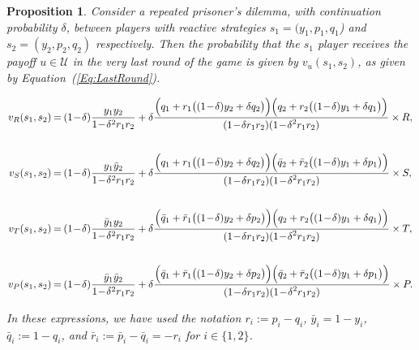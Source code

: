 \documentclass[11pt]{article}
\theoremstyle{plainCl1}
\newtheorem{Prop}{Proposition}
\theoremstyle{plainCl2}
\begin{document}
\begin{Prop}
    Consider a repeated prisoner's dilemma, with
    continuation probability $\delta$, between players with reactive strategies
    $s_1\!=\!(y_1, p_1, q_1$)  and $s_2\!=\!(y_2,p_2,q_2)$ respectively. Then the
    probability that the $s_1$ player receives the payoff $u\!\in\! \mathcal{U}$ in
    the very last round of the game is given by $v_{u}(s_1,s_2)$, as given by
    Equation~(\ref{Eq:LastRound}).

    \begin{equation} \label{Eq:LastRound}
      \setlength{\arraycolsep}{1pt}
      \begin{array}{rcl}
    
      v_{R}(s_1,s_2) &= &\displaystyle (1\!-\!\delta)\frac{y_1y_2}{1\!-\!\delta^2 r_1 r_2}+\delta \frac{\Big(q_1+r_1\big((1\!-\!\delta)y_2+\delta q_2\big)\Big) \Big(q_2+r_2\big((1\!-\!\delta)y_1+\delta q_1\big)\Big)}
      {\displaystyle(1\!-\!\delta r_1r_2)(1\!-\!\delta^2 r_1 r_2)} \times R,\\[1cm]
    
      v_{S}(s_1,s_2) &= &\displaystyle (1\!-\!\delta)\frac{y_1\bar{y}_2}{1\!-\!\delta^2 r_1 r_2}+\delta \frac{\Big(q_1+r_1\big((1\!-\!\delta)y_2+\delta q_2\big)\Big) \Big(\bar{q}_2+\bar{r}_2\big((1\!-\!\delta)y_1+\delta p_1\big)\Big)}
      {\displaystyle(1\!-\!\delta r_1r_2)(1\!-\!\delta^2 r_1 r_2)} \times S,\\[1cm]
    
      v_{T}(s_1,s_2) &= &\displaystyle (1\!-\!\delta)\frac{\bar{y}_1y_2}{1\!-\!\delta^2 r_1 r_2}+\delta \frac{\Big(\bar{q}_1+\bar{r}_1\big((1\!-\!\delta)y_2+\delta p_2\big)\Big) \Big(q_2+r_2\big((1\!-\!\delta)y_1+\delta q_1\big)\Big)}
      {\displaystyle(1\!-\!\delta r_1r_2)(1\!-\!\delta^2 r_1 r_2)} \times T,\\[1cm]
    
      v_{P}(s_1,s_2) &= &\displaystyle (1\!-\!\delta)\frac{\bar{y}_1\bar{y}_2}{1\!-\!\delta^2 r_1 r_2}+\delta \frac{\Big(\bar{q}_1+\bar{r}_1\big((1\!-\!\delta)y_2+\delta p_2\big)\Big) \Big(\bar{q}_2+\bar{r}_2\big((1\!-\!\delta)y_1+\delta p_1\big)\Big)}
      {\displaystyle(1\!-\!\delta r_1r_2)(1\!-\!\delta^2 r_1 r_2)} \times P.
      \end{array}
    \end{equation}

In these expressions, we have used the notation $r_i:=p_i\!-\!q_i$,
$\bar{y}_i\!=\!1\!-\!y_i$, $\bar{q}_i:=1\!-\!q_i$, and
$\bar{r}_i:=\bar{p}_i\!-\!\bar{q}_i=-r_i$ for $i\!\in\!\{1,2\}$.
\end{Prop}
\end{document}
